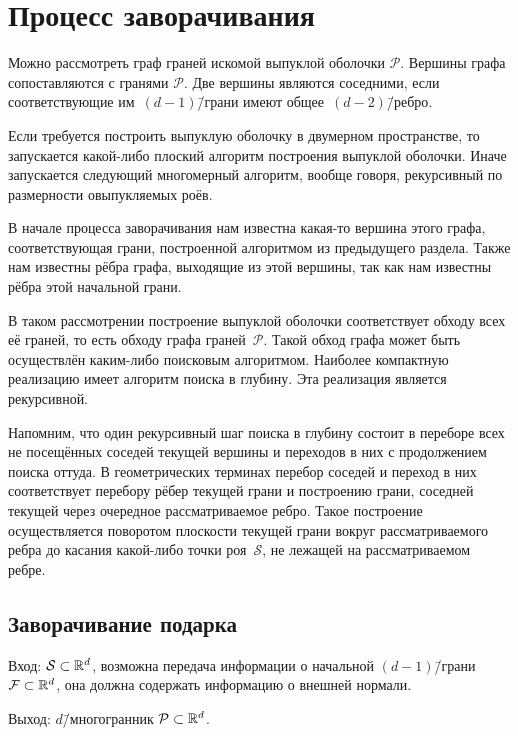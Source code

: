 \documentclass[a4paper,12pt]{article}
\newcommand{\R}[1][]{%
  \ifthenelse{\equal{#1}{}}%
  {\mathbb{R}}%
  {\mathbb{R}^{#1}}}
\newcommand{\Swarm}{\mathcal{S}}              %
\newcommand{\Polytop}{\mathcal{P}}         %
\newcommand{\Facet}{\mathcal{F}}              %
\renewcommand{\.}{\hspace{0.2ex}}
\begin{document}
\section{Процесс заворачивания}
  Можно рассмотреть граф граней искомой выпуклой оболочки $\Polytop$. Вершины графа сопоставляются с гранями $\Polytop$. Две вершины являются соседними, если соответствующие им~$(d-1)$\=/грани имеют общее~$(d-2)$\=/ребро.

  Если требуется построить выпуклую оболочку в двумерном пространстве, то запускается какой-либо плоский алгоритм построения выпуклой оболочки. Иначе запускается следующий многомерный алгоритм, вообще говоря, рекурсивный по размерности овыпукляемых роёв.

  В начале процесса заворачивания нам известна какая-то вершина этого графа, соответствующая грани, построенной алгоритмом из предыдущего раздела. Также нам известны рёбра графа, выходящие из этой вершины, так как нам известны рёбра этой начальной грани.

  В таком рассмотрении построение выпуклой оболочки соответствует обходу всех её граней, то есть обходу графа граней~$\Polytop$. Такой обход графа может быть осуществлён каким-либо поисковым алгоритмом. Наиболее компактную реализацию имеет алгоритм поиска в глубину. Эта реализация является рекурсивной.

  Напомним, что один рекурсивный шаг поиска в глубину состоит в переборе всех не посещённых соседей текущей вершины и переходов в них с продолжением поиска оттуда. В геометрических терминах перебор соседей и переход в них соответствует перебору рёбер текущей грани и построению грани, соседней текущей через очередное рассматриваемое ребро. Такое построение осуществляется поворотом плоскости текущей грани вокруг рассматриваемого ребра до касания какой-либо точки роя~$\Swarm$, не лежащей на рассматриваемом ребре.

  \subsection{Заворачивание подарка}
  \label{subsec:GW}

    Вход: $\Swarm \subset \R[d]$, возможна передача информации о начальной $(d-1)$\=/грани $\Facet \subset \R[d]$, она должна содержать информацию о внешней нормали.

    Выход: $d$\=/многогранник $\Polytop \subset \R[d]$.
\end{document}
